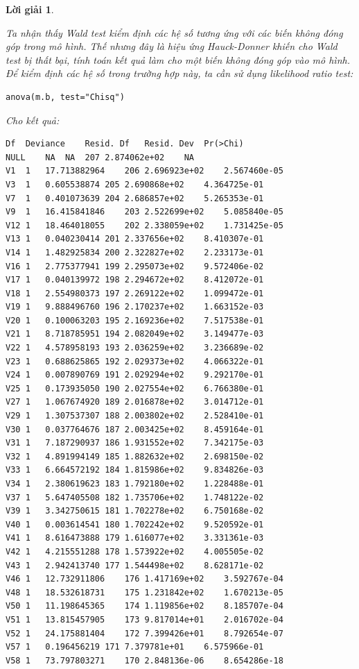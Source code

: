 \documentclass[14pt, a4paper]{article}
\theoremstyle{sltheorem}
\theoremstyle{soltheorem}
\newtheorem*{loigiai}{Lời giải}
\begin{document}
\begin{loigiai}
\begin{itemize}
        Ta nhận thấy Wald test kiểm định các hệ số tương ứng với các biến không đóng góp trong mô hình.
        Thế nhưng đây là hiệu ứng Hauck-Donner khiến cho Wald test bị thất bại, tính toán kết quả làm cho một biến không đóng góp vào mô hình.
        Để kiểm định các hệ số trong trường hợp này, ta cần sử dụng likelihood ratio test:

        \begin{verbatim}
anova(m.b, test="Chisq")
        \end{verbatim}

        Cho kết quả:

        \begin{verbatim}
Df	Deviance	Resid. Df	Resid. Dev	Pr(>Chi)
NULL	NA	NA	207	2.874062e+02	NA
V1	1	17.713882964	206	2.696923e+02	2.567460e-05
V3	1	0.605538874	205	2.690868e+02	4.364725e-01
V7	1	0.401073639	204	2.686857e+02	5.265353e-01
V9	1	16.415841846	203	2.522699e+02	5.085840e-05
V12	1	18.464018055	202	2.338059e+02	1.731425e-05
V13	1	0.040230414	201	2.337656e+02	8.410307e-01
V14	1	1.482925834	200	2.322827e+02	2.233173e-01
V16	1	2.775377941	199	2.295073e+02	9.572406e-02
V17	1	0.040139972	198	2.294672e+02	8.412072e-01
V18	1	2.554980373	197	2.269122e+02	1.099472e-01
V19	1	9.888496760	196	2.170237e+02	1.663152e-03
V20	1	0.100063203	195	2.169236e+02	7.517538e-01
V21	1	8.718785951	194	2.082049e+02	3.149477e-03
V22	1	4.578958193	193	2.036259e+02	3.236689e-02
V23	1	0.688625865	192	2.029373e+02	4.066322e-01
V24	1	0.007890769	191	2.029294e+02	9.292170e-01
V25	1	0.173935050	190	2.027554e+02	6.766380e-01
V27	1	1.067674920	189	2.016878e+02	3.014712e-01
V29	1	1.307537307	188	2.003802e+02	2.528410e-01
V30	1	0.037764676	187	2.003425e+02	8.459164e-01
V31	1	7.187290937	186	1.931552e+02	7.342175e-03
V32	1	4.891994149	185	1.882632e+02	2.698150e-02
V33	1	6.664572192	184	1.815986e+02	9.834826e-03
V34	1	2.380619623	183	1.792180e+02	1.228488e-01
V37	1	5.647405508	182	1.735706e+02	1.748122e-02
V39	1	3.342750615	181	1.702278e+02	6.750168e-02
V40	1	0.003614541	180	1.702242e+02	9.520592e-01
V41	1	8.616473888	179	1.616077e+02	3.331361e-03
V42	1	4.215551288	178	1.573922e+02	4.005505e-02
V43	1	2.942413740	177	1.544498e+02	8.628171e-02
V46	1	12.732911806	176	1.417169e+02	3.592767e-04
V48	1	18.532618731	175	1.231842e+02	1.670213e-05
V50	1	11.198645365	174	1.119856e+02	8.185707e-04
V51	1	13.815457905	173	9.817014e+01	2.016702e-04
V52	1	24.175881404	172	7.399426e+01	8.792654e-07
V57	1	0.196456219	171	7.379781e+01	6.575966e-01
V58	1	73.797803271	170	2.848136e-06	8.654286e-18
        \end{verbatim}
    \end{itemize}


\end{loigiai}
\end{document}
